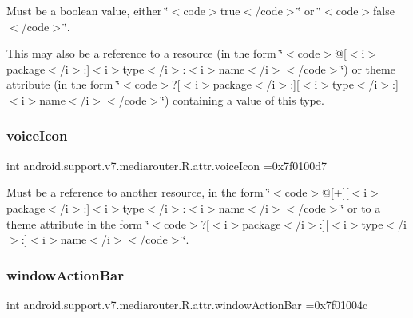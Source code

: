 Must be a boolean value, either \char`\"{}$<$code$>$true$<$/code$>$\char`\"{} or \char`\"{}$<$code$>$false$<$/code$>$\char`\"{}. 

This may also be a reference to a resource (in the form \char`\"{}$<$code$>$@\mbox{[}$<$i$>$package$<$/i$>$\+:\mbox{]}$<$i$>$type$<$/i$>$\+:$<$i$>$name$<$/i$>$$<$/code$>$\char`\"{}) or theme attribute (in the form \char`\"{}$<$code$>$?\mbox{[}$<$i$>$package$<$/i$>$\+:\mbox{]}\mbox{[}$<$i$>$type$<$/i$>$\+:\mbox{]}$<$i$>$name$<$/i$>$$<$/code$>$\char`\"{}) containing a value of this type. \mbox{\label{classandroid_1_1support_1_1v7_1_1mediarouter_1_1R_1_1attr_a123ea20b20287eb9f23c52cb995886c4}} 
\subsubsection{\texorpdfstring{voice\+Icon}{voiceIcon}}
{\footnotesize\ttfamily int android.\+support.\+v7.\+mediarouter.\+R.\+attr.\+voice\+Icon =0x7f0100d7\hspace{0.3cm}{\ttfamily [static]}}

Must be a reference to another resource, in the form \char`\"{}$<$code$>$@\mbox{[}+\mbox{]}\mbox{[}$<$i$>$package$<$/i$>$\+:\mbox{]}$<$i$>$type$<$/i$>$\+:$<$i$>$name$<$/i$>$$<$/code$>$\char`\"{} or to a theme attribute in the form \char`\"{}$<$code$>$?\mbox{[}$<$i$>$package$<$/i$>$\+:\mbox{]}\mbox{[}$<$i$>$type$<$/i$>$\+:\mbox{]}$<$i$>$name$<$/i$>$$<$/code$>$\char`\"{}. \mbox{\label{classandroid_1_1support_1_1v7_1_1mediarouter_1_1R_1_1attr_a91fe25780bb1bdc502dc1c2a33c8549d}} 
\subsubsection{\texorpdfstring{window\+Action\+Bar}{windowActionBar}}
{\footnotesize\ttfamily int android.\+support.\+v7.\+mediarouter.\+R.\+attr.\+window\+Action\+Bar =0x7f01004c\hspace{0.3cm}{\ttfamily [static]}}

